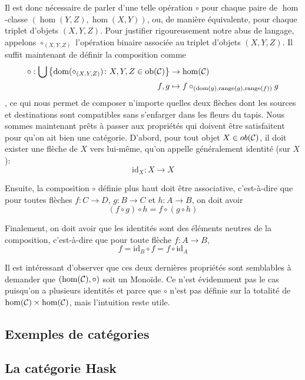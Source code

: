 Il est donc nécessaire de parler d'une telle opération $\circ$ pour chaque
paire de $\hom$-classe $\left(\hom(Y, Z), \hom(X, Y)\right)$, ou, de manière
équivalente, pour chaque triplet d'objets $\left(X, Y, Z\right)$. Pour justifier
rigoureusement notre abus de langage, appelons $\circ_{\left(X,Y,Z\right)}$
l'opération binaire associée au triplet d'objets $\left(X,Y,Z\right)$.
Il suffit maintenant de définir la composition comme
\begin{align*}
    \circ : \bigcup \left\{ \mathrm{dom}(\circ_{\left(X,Y,Z\right)})
                            \colon X, Y, Z \in \mathrm{ob}(\mathcal{C}) \right\} &\to \hom(\mathcal{C}) \\
           f, g &\mapsto f \circ_{\left(\mathrm{dom}(g), \mathrm{range}(g), \mathrm{range}(f)\right)} g
\end{align*}
, ce qui nous permet de composer n'importe quelles deux flèches dont les sources
et destinations sont compatibles sans s'enfarger dans les fleurs du tapis. Nous
sommes maintenant prêts à passer aux propriétés qui doivent être satisfaitent
pour qu'on ait bien une catégorie. D'abord, pour tout objet $X \in ob(\mathcal{C})$, il
doit exister une flèche de $X$ vers lui-même, qu'on appelle généralement
identité (sur $X$):
\[
    \mathrm{id}_X : X \to X
\]

Ensuite, la composition $\circ$ définie plus haut doit être associative,
c'est-à-dire que pour toutes flèches $f : C \to D$, $g : B \to C$ et
$h : A \to B$, on doit avoir
\[
    (f \circ g) \circ h = f \circ (g \circ h)
\]

Finalement, on doit avoir que les identités sont des éléments neutres de la
composition, c'est-à-dire que pour toute flèche $f : A \to B$,
\[
    f = \mathrm{id}_B \circ f = f \circ \mathrm{id}_A
\]

Il est intéressant d'observer que ces deux dernières propriétés sont
semblables à demander que $\left(\hom(\mathcal{C}), \circ\right)$ soit un Monoïde.
Ce n'est évidemment pas le cas puisqu'on a plusieurs identités et parce
que $\circ$ n'est pas définie sur la totalité de $\hom(\mathcal{C}) \times \hom(\mathcal{C})$,
mais l'intuition reste utile.



\subsection{Exemples de catégories}
\subsection{La catégorie Hask}


